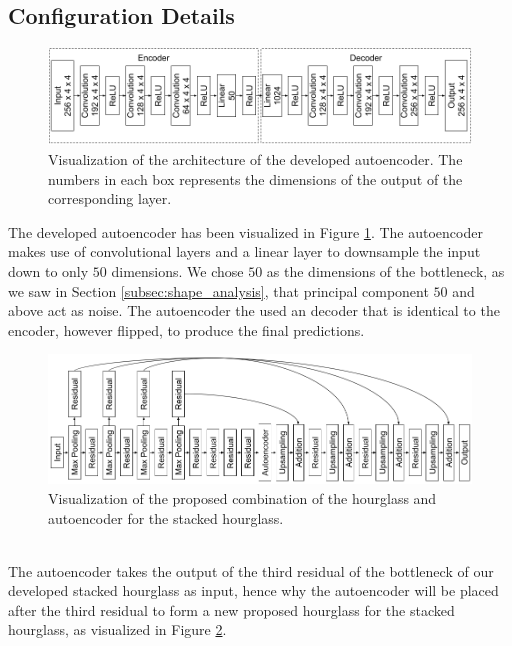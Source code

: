 \documentclass[./main.tex]{subfiles}
\begin{document}
\subsection{Configuration Details}\label{subsec:improv_conf_details}
\begin{figure}[htbp]
    \centering
    \includegraphics[width = \textwidth]{entities/Ae_model.png}
    \caption{Visualization of the architecture of the developed autoencoder. The numbers in each box represents the dimensions of the output of the corresponding layer.}
    \label{fig:AE_model}
\end{figure}
\noindent The developed autoencoder has been visualized in Figure \ref{fig:AE_model}. The autoencoder makes use of convolutional layers and a linear layer to downsample the input down to only $50$ dimensions. We chose $50$ as the dimensions of the bottleneck, as we saw in Section \ref{subsec:shape_analysis}, that principal component $50$ and above act as noise. The autoencoder the used an decoder that is identical to the encoder, however flipped, to produce the final predictions.
\\
\begin{figure}[htbp]
    \centering
    \includegraphics[width = \textwidth]{entities/SHG_AE.png}
    \caption{Visualization of the proposed combination of the hourglass and autoencoder for the stacked hourglass.}
    \label{fig:SHG_AE}
\end{figure}
\\
The autoencoder takes the output of the third residual of the bottleneck of our developed stacked hourglass as input, hence why the autoencoder will be placed after the third residual to form a new proposed hourglass for the stacked hourglass, as visualized in Figure \ref{fig:SHG_AE}.
\\
\end{document}

